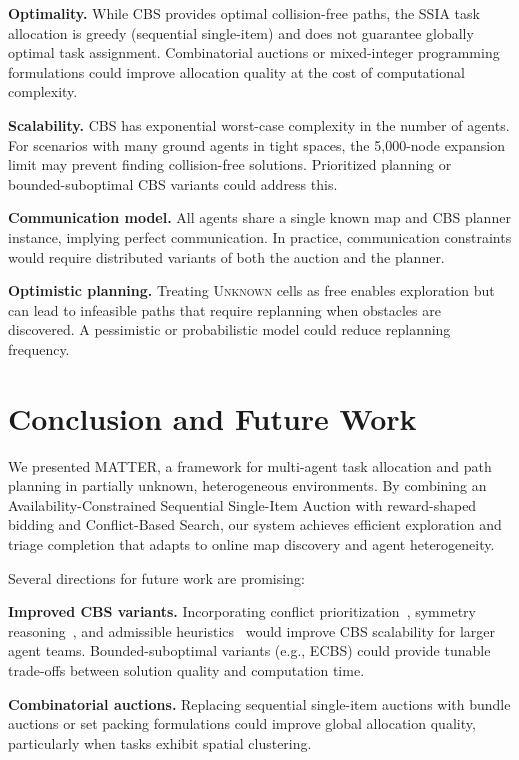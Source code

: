 \documentclass[conference]{IEEEtran}
\begin{document}
\textbf{Optimality.} While CBS provides optimal collision-free paths, the SSIA task allocation is greedy (sequential single-item) and does not guarantee globally optimal task assignment. Combinatorial auctions or mixed-integer programming formulations could improve allocation quality at the cost of computational complexity.

\textbf{Scalability.} CBS has exponential worst-case complexity in the number of agents. For scenarios with many ground agents in tight spaces, the 5{,}000-node expansion limit may prevent finding collision-free solutions. Prioritized planning or bounded-suboptimal CBS variants could address this.

\textbf{Communication model.} All agents share a single known map and CBS planner instance, implying perfect communication. In practice, communication constraints would require distributed variants of both the auction and the planner.

\textbf{Optimistic planning.} Treating \textsc{Unknown} cells as free enables exploration but can lead to infeasible paths that require replanning when obstacles are discovered. A pessimistic or probabilistic model could reduce replanning frequency.

\section{Conclusion and Future Work}

We presented MATTER, a framework for multi-agent task allocation and path planning in partially unknown, heterogeneous environments. By combining an Availability-Constrained Sequential Single-Item Auction with reward-shaped bidding and Conflict-Based Search, our system achieves efficient exploration and triage completion that adapts to online map discovery and agent heterogeneity.

Several directions for future work are promising:

\textbf{Improved CBS variants.} Incorporating conflict prioritization~\cite{boyarski2015icbs}, symmetry reasoning~\cite{li2021symmetry}, and admissible heuristics~\cite{felner2018heuristics} would improve CBS scalability for larger agent teams. Bounded-suboptimal variants (e.g., ECBS) could provide tunable trade-offs between solution quality and computation time.

\textbf{Combinatorial auctions.} Replacing sequential single-item auctions with bundle auctions or set packing formulations could improve global allocation quality, particularly when tasks exhibit spatial clustering.
\end{document}
